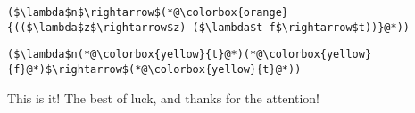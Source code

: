 \documentclass{beamer}
\begin{document}
\begin{frame}[fragile]{\CurrentSection}
\lstset{basicstyle=\ttfamily\small}\lstset{numbers=none}\lstset{language=ML}\begin{lstlisting}
($\lambda$n$\rightarrow$(*@\colorbox{orange}{(($\lambda$z$\rightarrow$z) ($\lambda$t f$\rightarrow$t))}@*))
\end{lstlisting}
\pause\lstset{language=ML}\begin{lstlisting}
($\lambda$n(*@\colorbox{yellow}{t}@*)(*@\colorbox{yellow}{f}@*)$\rightarrow$(*@\colorbox{yellow}{t}@*))
\end{lstlisting}

\end{frame}


\begin{frame}{This is it!}
\center
\fontsize{18pt}{7.2}\selectfont
The best of luck, and thanks for the attention!
\end{frame}
\end{document}
